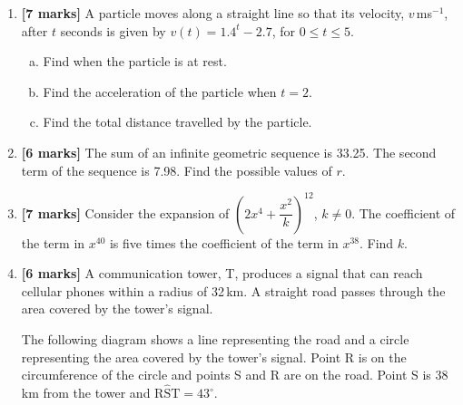 \documentclass[12pt, twoside]{article}
\begin{document}
\begin{enumerate}
\vspace{1cm}

\item \textbf{[7 marks]} A particle moves along a straight line so that its velocity, $v$\,ms$^{-1}$, after $t$ seconds is given by $v(t) = 1.4^t - 2.7$, for $0 \leq t \leq 5$.

\begin{enumerate}[(a)]
    \item Find when the particle is at rest.
    \item Find the acceleration of the particle when $t = 2$.
    \item Find the total distance travelled by the particle.
\end{enumerate}

\vspace{1cm}

\item \textbf{[6 marks]} The sum of an infinite geometric sequence is 33.25. The second term of the sequence is 7.98. Find the possible values of $r$.

\vspace{1cm}

\item \textbf{[7 marks]} Consider the expansion of $\left(2x^4 + \dfrac{x^2}{k}\right)^{12}$, $k \neq 0$. The coefficient of the term in $x^{40}$ is five times the coefficient of the term in $x^{38}$. Find $k$.

\vspace{1cm}

\item \textbf{[6 marks]} A communication tower, T, produces a signal that can reach cellular phones within a radius of 32\,km. A straight road passes through the area covered by the tower's signal.

The following diagram shows a line representing the road and a circle representing the area covered by the tower's signal. Point R is on the circumference of the circle and points S and R are on the road. Point S is 38\,km from the tower and $\mathrm{R\hat{S}T} = 43^\circ$.

\begin{center}
\end{center}
\end{enumerate}
\end{document}
